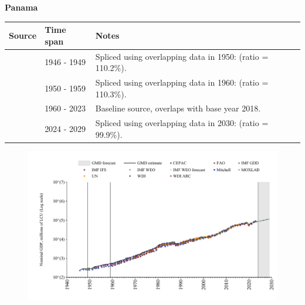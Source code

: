 \documentclass[12pt,a4paper,landscape]{article}
\begin{document}
\begin{adjustbox}{max totalsize={\paperwidth}{\paperheight},center}
\begin{minipage}[t][\textheight][t]{\textwidth}
\vspace*{0.5cm}
{}
\begin{center}
{\Large\bfseries Panama}
\end{center}
\vspace{0.5cm}
\begin{table}[H]
\centering
\small
\begin{tabular}{|l|l|l|}
\hline
\textbf{Source} & \textbf{Time span} & \textbf{Notes} \\
\hline
\rowcolor{white}\cite{Mitchell}& 1946 - 1949 &Spliced using overlapping data in 1950: (ratio = 110.2\%).\\
\rowcolor{lightgray}\cite{IMF_IFS}& 1950 - 1959 &Spliced using overlapping data in 1960: (ratio = 110.3\%).\\
\rowcolor{white}\cite{WDI}& 1960 - 2023 &Baseline source, overlaps with base year 2018.\\
\rowcolor{lightgray}\cite{IMF_WEO_forecast}& 2024 - 2029 &Spliced using overlapping data in 2030: (ratio = 99.9\%).\\
\hline
\end{tabular}
\end{table}
\begin{figure}[H]
\centering
\includegraphics[width=\textwidth,height=0.6\textheight,keepaspectratio]{graphs/PAN_nGDP.pdf}
\end{figure}
\end{minipage}
\end{adjustbox}
\end{document}
